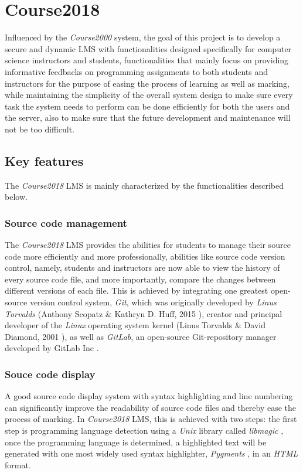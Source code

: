 \section{Course2018}
Influenced by the \emph{Course2000} system, the goal of this project is to
develop a secure and dynamic LMS with functionalities designed specifically for
computer science instructors and students, functionalities that mainly focus on
providing informative feedbacks on programming assignments to both students
and instructors for the purpose of easing the process of learning as well as
marking, while maintaining the simplicity of
the overall system design to make sure every task the system needs to
perform can be done efficiently for both the users and the server, also to make
sure that the future development and maintenance will not be too difficult.

\subsection{Key features}
The \emph{Course2018} LMS is mainly characterized by the functionalities
described below.

\subsubsection{Source code management}
The \emph{Course2018} LMS provides the abilities for students to manage
their source code more efficiently and more professionally, abilities like 
source code version control, namely, students and instructors are now able
to view the history of every source code file, and more importantly, compare
the changes between different versions of each file.
This is achieved by integrating one greatest open-source version control system,
\emph{Git}, which was originally developed by \emph{Linus Torvalds} 
(Anthony Scopatz \& Kathryn D. Huff, 2015 \cite{git}),
creator and principal developer of the \emph{Linux} operating system kernel
(Linus Torvalds \& David Diamond, 2001 \cite{lTorvalds}), as well as 
\emph{GitLab}, an open-source Git-repository manager developed by GitLab Inc
\cite{gitlab}.

\subsubsection{Souce code display}
A good source code display system with syntax highlighting and line numbering
can significantly improve the readability of source code files and thereby ease
the process of marking. In \emph{Course2018} LMS, this is achieved with two
steps: the first step is programming language detection using a \emph{Unix} library
called \emph{libmagic} \cite{libmagic}, once the programming language is
determined, a highlighted text will be generated with one most widely used
syntax highlighter, \emph{Pygments} \cite{pygments}, in an \emph{HTML} format.

